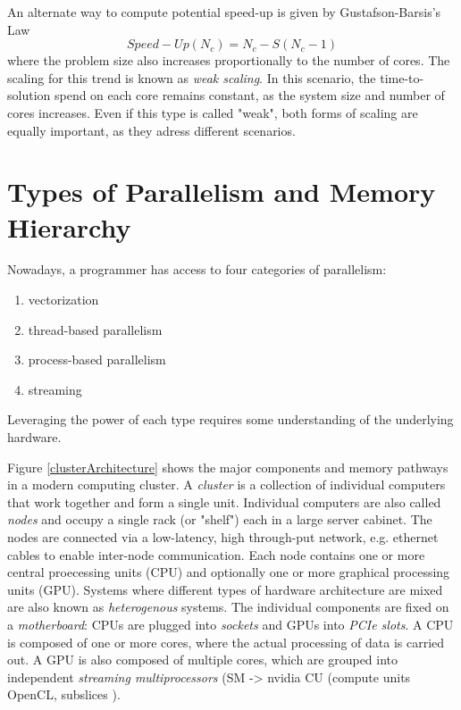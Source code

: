 An alternate way to compute potential speed-up is given by Gustafson-Barsis's Law
\begin{equation}
Speed-Up(N_c) = N_c - S(N_c-1)
\end{equation}
\noindent where the problem size also increases proportionally to the number of cores. The scaling for this trend is known as \emph{weak scaling}. In this scenario, the time-to-solution spend on each core remains constant, as the system size and number of cores increases. Even if this type is called "weak", both forms of scaling are equally important, as they adress different scenarios. 

\section{Types of Parallelism and Memory Hierarchy}

Nowadays, a programmer has access to four categories of parallelism:
\begin{enumerate}
\item vectorization
\item thread-based parallelism
\item process-based parallelism
\item streaming
\end{enumerate} 
\noindent Leveraging the power of each type requires some understanding of the underlying hardware. 

Figure \ref{clusterArchitecture} shows the major components and memory pathways in a modern computing cluster. A \emph{cluster} is a collection of individual computers that work together and form a single unit. Individual computers are also called \emph{nodes} and occupy a single rack (or "shelf") each in a large server cabinet. The nodes are connected via a low-latency, high through-put network, e.g. ethernet cables to enable inter-node communication. Each node contains one or more central proecessing units (CPU) and optionally one or more graphical processing units (GPU). Systems where different types of hardware architecture are mixed are also known as \emph{heterogenous} systems. The individual components are fixed on a \emph{motherboard}: CPUs are plugged into \emph{sockets} and GPUs into \emph{PCIe slots}. A CPU is composed of one or more cores, where the actual processing of data is carried out. A GPU is also composed of multiple cores, which are grouped into independent \emph{streaming multiprocessors} (SM -> nvidia CU (compute units OpenCL, subslices ). 

